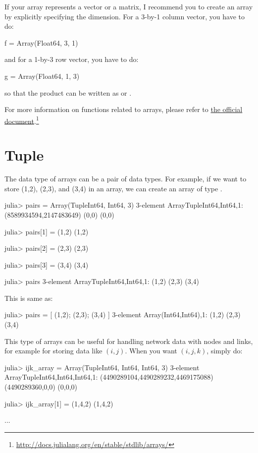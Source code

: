 If your array represents a vector or a matrix, I recommend you to create an array by explicitly specifying the dimension. For a 3-by-1 column vector, you have to do:
\begin{code}
f = Array(Float64, 3, 1)
\end{code}
\noindent and for a 1-by-3 row vector, you have to do:
\begin{code}
g = Array(Float64, 1, 3)
\end{code}
\noindent so that the product can be written as  or .


For more information on functions related to arrays, please refer to \href{http://docs.julialang.org/en/stable/stdlib/arrays/}{the official document}.\footnote{\url{http://docs.julialang.org/en/stable/stdlib/arrays/}}



\section{Tuple}

The data type of arrays can be a pair of data types. For example, if we want to store (1,2), (2,3), and (3,4) in an array, we can create an array of type .
\begin{code}
julia> pairs = Array(Tuple{Int64, Int64}, 3)
3-element Array{Tuple{Int64,Int64},1}:
 (8589934594,2147483649)
 (0,0)
 (0,0)

julia> pairs[1] = (1,2)
(1,2)

julia> pairs[2] = (2,3)
(2,3)

julia> pairs[3] = (3,4)
(3,4)

julia> pairs
3-element Array{Tuple{Int64,Int64},1}:
 (1,2)
 (2,3)
 (3,4)
\end{code}
\noindent This is same as:
\begin{code}
julia> pairs = [ (1,2); (2,3); (3,4) ]
3-element Array{(Int64,Int64),1}:
 (1,2)
 (2,3)
 (3,4)
\end{code}
\noindent This type of arrays can be useful for handling network data with nodes and links, for example for storing data like $(i,j)$. When you want $(i,j,k)$, simply do:
\begin{code}
julia> ijk_array = Array(Tuple{Int64, Int64, Int64}, 3)
3-element Array{Tuple{Int64,Int64,Int64},1}:
 (4490289104,4490289232,4469175088)
 (4490289360,0,0)
 (0,0,0)

julia> ijk_array[1] = (1,4,2)
(1,4,2)

...
\end{code}




